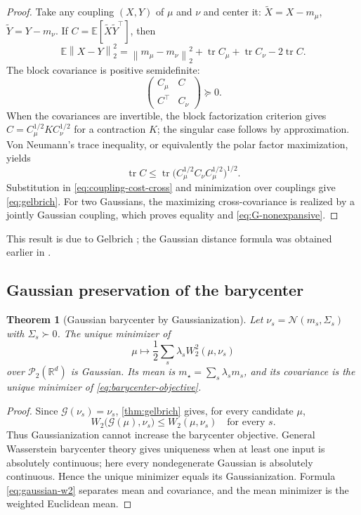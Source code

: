 \documentclass[11pt]{article}
\newtheorem{theorem}{Theorem}[section]
\theoremstyle{definition}
\newcommand{\R}{\mathbb R}
\newcommand{\tr}{\operatorname{tr}}
\newcommand{\cN}{\mathcal N}
\newcommand{\cP}{\mathcal P}
\newcommand{\cG}{\mathcal G}
\newcommand{\norm}[1]{\left\lVert #1\right\rVert}
\begin{document}
\begin{proof}
Take any coupling $(X,Y)$ of $\mu$ and $\nu$ and center it:
$\widetilde X=X-m_\mu$, $\widetilde Y=Y-m_\nu$.  If
$C=\mathbb E[\widetilde X\widetilde Y^\top]$, then
\begin{equation}\label{eq:coupling-cost-cross}
 \mathbb E\norm{X-Y}_2^2
 =\norm{m_\mu-m_\nu}_2^2+
 \tr C_\mu+\tr C_\nu-2\tr C.
\end{equation}
The block covariance is positive semidefinite:
\[
 \begin{pmatrix}C_\mu&C\\C^\top&C_\nu\end{pmatrix}\succeq0.
\]
When the covariances are invertible, the block factorization criterion gives
$C=C_\mu^{1/2}KC_\nu^{1/2}$ for a contraction $K$; the singular case follows
by approximation.  Von Neumann's trace inequality, or equivalently the polar
factor maximization, yields
\[
 \tr C\leq
 \tr\bigl(C_\mu^{1/2}C_\nu C_\mu^{1/2}\bigr)^{1/2}.
\]
Substitution in \eqref{eq:coupling-cost-cross} and minimization over couplings
give \eqref{eq:gelbrich}.  For two Gaussians, the maximizing cross-covariance
is realized by a jointly Gaussian coupling, which proves equality and
\eqref{eq:G-nonexpansive}.
\end{proof}

This result is due to Gelbrich \cite{Gelbrich1990}; the Gaussian distance
formula was obtained earlier in
\cite{DowsonLandau1982,OlkinPukelsheim1982,GivensShortt1984}.

\subsection{Gaussian preservation of the barycenter}

\begin{theorem}[Gaussian barycenter by Gaussianization]\label{thm:gaussian-barycenter}
Let $\nu_s=\cN(m_s,\Sigma_s)$ with $\Sigma_s\succ0$.  The unique minimizer of
\begin{equation}\label{eq:measure-barycenter}
 \mu\longmapsto \frac12\sum_s\lambda_sW_2^2(\mu,\nu_s)
\end{equation}
over $\cP_2(\R^d)$ is Gaussian.  Its mean is
$m_\star=\sum_s\lambda_sm_s$, and its covariance is the unique minimizer of
\eqref{eq:barycenter-objective}.
\end{theorem}

\begin{proof}
Since $\cG(\nu_s)=\nu_s$, \cref{thm:gelbrich} gives, for every candidate
$\mu$,
\[
 W_2\bigl(\cG(\mu),\nu_s\bigr)\leq W_2(\mu,\nu_s)
 \quad\text{for every }s.
\]
Thus Gaussianization cannot increase the barycenter objective.  General
Wasserstein barycenter theory gives uniqueness when at least one input is
absolutely continuous; here every nondegenerate Gaussian is absolutely
continuous.  Hence the unique minimizer equals its Gaussianization.  Formula
\eqref{eq:gaussian-w2} separates mean and covariance, and the mean minimizer is
the weighted Euclidean mean.
\end{proof}
\end{document}
